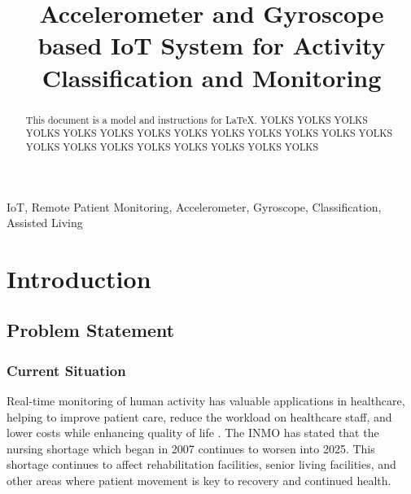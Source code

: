 \documentclass[conference]{IEEEtran}
\begin{document}
\title{Accelerometer and Gyroscope based IoT System for Activity Classification and Monitoring\\
}

\author{
\and
{}
}

\maketitle

\begin{abstract}
This document is a model and instructions for \LaTeX.
YOLKS YOLKS YOLKS YOLKS YOLKS YOLKS YOLKS YOLKS YOLKS YOLKS YOLKS YOLKS YOLKS YOLKS YOLKS YOLKS YOLKS YOLKS YOLKS YOLKS YOLKS 
\end{abstract}

\begin{IEEEkeywords}
IoT, Remote Patient Monitoring, Accelerometer, Gyroscope, Classification, Assisted Living
\end{IEEEkeywords}

\section{Introduction}


\subsection{Problem Statement}

\subsubsection{Current Situation}
Real-time monitoring of human activity has valuable applications in healthcare, helping to improve patient care, reduce the workload on healthcare staff, and lower costs while enhancing quality of life \cite{b1}. The INMO has stated that the nursing shortage which began in 2007 continues to worsen into 2025\cite{inmo}. This shortage continues to affect rehabilitation facilities, senior living facilities, and other areas where patient movement is key to recovery and continued health.
\end{document}
